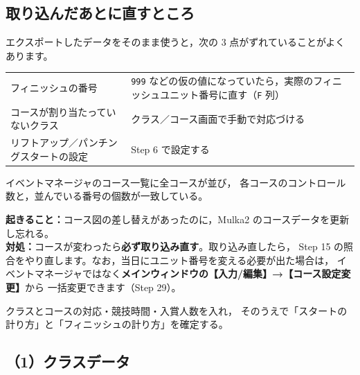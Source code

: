 \subsection*{取り込んだあとに直すところ}

エクスポートしたデータをそのまま使うと，次の 3 点がずれていることがよくあります。

\begin{center}
\small
\begin{tabular}{@{}P{40mm}P{104mm}@{}}
\toprule
{} &  \\
\midrule
フィニッシュの番号 & \texttt{999} などの仮の値になっていたら，実際のフィニッシュユニット番号に直す（\texttt{F} 列） \\
コースが割り当たっていないクラス & クラス／コース画面で手動で対応づける \\
リフトアップ／パンチングスタートの設定 & Step 6 で設定する \\
\bottomrule
\end{tabular}
\end{center}

\begin{Done}
イベントマネージャのコース一覧に全コースが並び，
各コースのコントロール数と，並んでいる番号の個数が一致している。
\end{Done}

\begin{Fail}
\textbf{起きること：}コース図の差し替えがあったのに，Mulka2 のコースデータを更新し忘れる。\\
\textbf{対処：}コースが変わったら\textbf{必ず取り込み直す}。取り込み直したら，
Step 15 の照合をやり直します。なお，当日にユニット番号を変える必要が出た場合は，
イベントマネージャではなく\textbf{メインウィンドウの【入力/編集】→【コース設定変更】}から
一括変更できます（Step 29）。
\end{Fail}


\begin{Goal}
クラスとコースの対応・競技時間・入賞人数を入れ，
そのうえで「スタートの計り方」と「フィニッシュの計り方」を確定する。
\end{Goal}

\subsection*{（1）クラスデータ}

